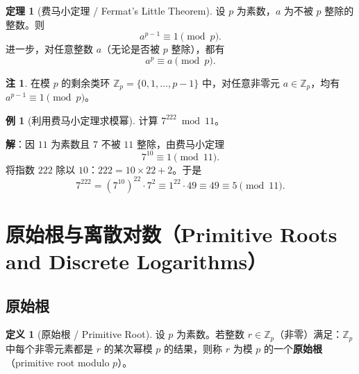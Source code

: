 \documentclass[UTF8,11pt,a4paper]{ctexbook}   %
\theoremstyle{definition}
\newtheorem{definition}{定义}[section]
\newtheorem{theorem}{定理}[section]
\newtheorem{example}{例}[section]
\newtheorem{remark}{注}[section]
\begin{document}
\begin{theorem}[费马小定理 / Fermat's Little Theorem]
设 $p$ 为素数，$a$ 为不被 $p$ 整除的整数。则
\[
a^{p-1} \equiv 1 \pmod{p}.
\]
进一步，对任意整数 $a$（无论是否被 $p$ 整除），都有
\[
a^p \equiv a \pmod{p}.
\]
\end{theorem}

\begin{remark}
在模 $p$ 的剩余类环 $\mathbb{Z}_p = \{0,1,\ldots,p-1\}$ 中，对任意非零元 $a \in \mathbb{Z}_p$，均有 $a^{p-1} \equiv 1 \pmod{p}$。
\end{remark}

\begin{example}[利用费马小定理求模幂]
计算 $7^{222} \bmod 11$。

\textbf{解}：因 $11$ 为素数且 $7$ 不被 $11$ 整除，由费马小定理
\[
7^{10} \equiv 1 \pmod{11}.
\]
将指数 $222$ 除以 $10$：$222 = 10 \times 22 + 2$。于是
\[
7^{222} = (7^{10})^{22} \cdot 7^2 \equiv 1^{22} \cdot 49 \equiv 49 \equiv 5 \pmod{11}.
\]
\end{example}

\section{原始根与离散对数（Primitive Roots and Discrete Logarithms）}

\subsection{原始根}

\begin{definition}[原始根 / Primitive Root]
设 $p$ 为素数。若整数 $r \in \mathbb{Z}_p$（非零）满足：$\mathbb{Z}_p$ 中每个非零元素都是 $r$ 的某次幂模 $p$ 的结果，则称 $r$ 为模 $p$ 的一个\textbf{原始根}（primitive root modulo $p$）。
\end{definition}
\end{document}
